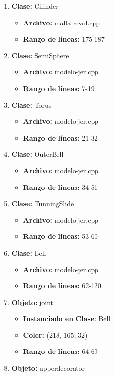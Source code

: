 \documentclass[10pt, a4paper]{article}
\begin{document}
\begin{enumerate}
	\item \textbf{Clase:} Cilinder
	\begin{itemize}
		\item \textbf{Archivo:} malla-revol.cpp
		\item \textbf{Rango de líneas:} 175-187
	\end{itemize}
	\item \textbf{Clase:} SemiSphere
	\begin{itemize}
		\item \textbf{Archivo:} modelo-jer.cpp
		\item \textbf{Rango de líneas:} 7-19
	\end{itemize}
	\item \textbf{Clase:} Torus
	\begin{itemize}
		\item \textbf{Archivo:} modelo-jer.cpp
		\item \textbf{Rango de líneas:} 21-32
	\end{itemize}
	\item \textbf{Clase:} OuterBell
	\begin{itemize}
		\item \textbf{Archivo:} modelo-jer.cpp
		\item \textbf{Rango de líneas:} 34-51
	\end{itemize}
	\item \textbf{Clase:} TunningSlide
	\begin{itemize}
		\item \textbf{Archivo:} modelo-jer.cpp
		\item \textbf{Rango de líneas:} 53-60
	\end{itemize}
	\item \textbf{Clase:} Bell
	\begin{itemize}
		\item \textbf{Archivo:} modelo-jer.cpp
		\item \textbf{Rango de líneas:} 62-120
	\end{itemize}
	\item \textbf{Objeto:} joint
	\begin{itemize}
		\item \textbf{Instanciado en Clase:} Bell
		\item \textbf{Color:} (218, 165, 32)
		\item \textbf{Rango de líneas:} 64-69
	\end{itemize}
	\item \textbf{Objeto:} upperdecorator

\end{enumerate}
\end{document}

